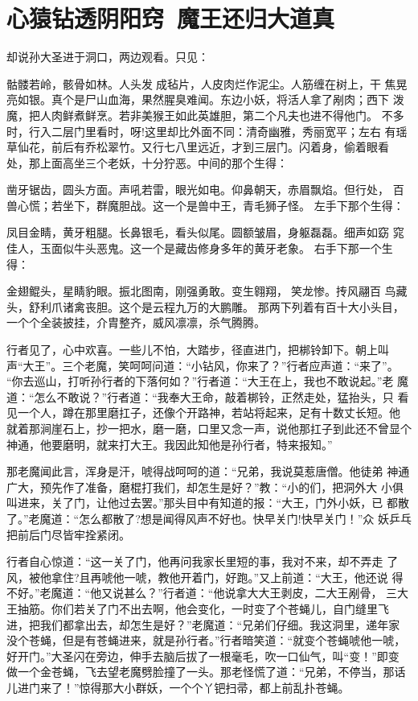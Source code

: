 \chapter{心猿钻透阴阳窍~魔王还归大道真}

却说孙大圣进于洞口，两边观看。只见：

骷髅若岭，骸骨如林。人头发成毡片，人皮肉烂作泥尘。人筋缠在树上，干
焦晃亮如银。真个是尸山血海，果然腥臭难闻。东边小妖，将活人拿了剐肉；西下
泼魔，把人肉鲜煮鲜烹。若非美猴王如此英雄胆，第二个凡夫也进不得他门。
不多时，行入二层门里看时，呀!这里却比外面不同：清奇幽雅，秀丽宽平；左右
有瑶草仙花，前后有乔松翠竹。又行七八里远近，才到三层门。闪着身，偷着眼看
处，那上面高坐三个老妖，十分狞恶。中间的那个生得：

凿牙锯齿，圆头方面。声吼若雷，眼光如电。仰鼻朝天，赤眉飘焰。但行处，
百兽心慌；若坐下，群魔胆战。这一个是兽中王，青毛狮子怪。
左手下那个生得：

凤目金睛，黄牙粗腿。长鼻银毛，看头似尾。圆额皱眉，身躯磊磊。细声如窈
窕佳人，玉面似牛头恶鬼。这一个是藏齿修身多年的黄牙老象。
右手下那一个生得：

金翅鲲头，星睛豹眼。振北图南，刚强勇敢。变生翱翔，笑龙惨。抟风翮百
鸟藏头，舒利爪诸禽丧胆。这个是云程九万的大鹏雕。
那两下列着有百十大小头目，一个个全装披挂，介胄整齐，威风凛凛，杀气腾腾。

行者见了，心中欢喜。一些儿不怕，大踏步，径直进门，把梆铃卸下。朝上叫
声“大王”。三个老魔，笑呵呵问道：“小钻风，你来了？”行者应声道：“来了”。
“你去巡山，打听孙行者的下落何如？”行者道：“大王在上，我也不敢说起。”老
魔道：“怎么不敢说？”行者道：“我奉大王命，敲着梆铃，正然走处，猛抬头，只
看见一个人，蹲在那里磨扛子，还像个开路神，若站将起来，足有十数丈长短。他
就着那涧崖石上，抄一把水，磨一磨，口里又念一声，说他那扛子到此还不曾显个
神通，他要磨明，就来打大王。我因此知他是孙行者，特来报知。”

那老魔闻此言，浑身是汗，唬得战呵呵的道：“兄弟，我说莫惹唐僧。他徒弟
神通广大，预先作了准备，磨棍打我们，却怎生是好？”教：“小的们，把洞外大
小俱叫进来，关了门，让他过去罢。”那头目中有知道的报：“大王，门外小妖，已
都散了。”老魔道：“怎么都散了?想是闻得风声不好也。快早关门!快早关门！”众
妖乒乓把前后门尽皆牢拴紧闭。

行者自心惊道：“这一关了门，他再问我家长里短的事，我对不来，却不弄走
了风，被他拿住?且再唬他一唬，教他开着门，好跑。”又上前道：“大王，他还说
得不好。”老魔道：“他又说甚么？”行者道：“他说拿大大王剥皮，二大王剐骨，
三大王抽筋。你们若关了门不出去啊，他会变化，一时变了个苍蝇儿，自门缝里飞
进，把我们都拿出去，却怎生是好？”老魔道：“兄弟们仔细。我这洞里，递年家
没个苍蝇，但是有苍蝇进来，就是孙行者。”行者暗笑道：“就变个苍蝇唬他一唬，
好开门。”大圣闪在旁边，伸手去脑后拔了一根毫毛，吹一口仙气，叫“变！”即变
做一个金苍蝇，飞去望老魔劈脸撞了一头。那老怪慌了道：“兄弟，不停当，那话
儿进门来了！”惊得那大小群妖，一个个丫钯扫帚，都上前乱扑苍蝇。

